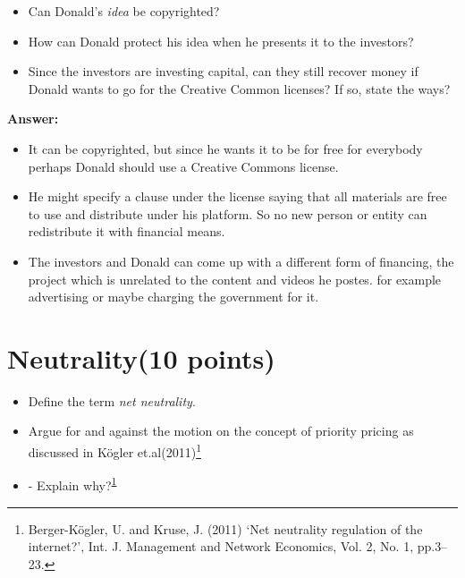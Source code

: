 \documentclass{WeSTassignment}
\begin{document}
\begin{itemize}
\item Can Donald's \emph{idea} be copyrighted?
\item How can Donald protect his idea when he presents it to the investors?
\item Since the investors are investing capital, can they still recover money if Donald wants to go for the Creative Common licenses? If so, state the ways?  \\
\end{itemize}

\textbf{Answer:}
\begin{itemize}
\item It can be copyrighted, but since he wants it to be for free for everybody perhaps Donald should use a Creative Commons license.
\item He might specify a clause under the license saying that all materials are free to use and distribute under his platform. So no new person or entity can redistribute it with financial means.
\item The investors and Donald can come up with a different form of financing, the project which is unrelated to the content and videos he postes. for example advertising or maybe charging the government for it.
\end{itemize}


\section{Neutrality(10 points)}

\begin{itemize}
\item Define the term \emph{net neutrality}.
\item Argue for and against the motion on the concept of priority pricing as discussed in Kögler et.al(2011)\footnote{\label{note1}Berger-Kögler, U. and Kruse, J. (2011) ‘Net neutrality regulation of the internet?’, Int. J. Management and Network Economics, Vol. 2, No. 1, pp.3–23.}
\item - Explain why?\textsuperscript{\ref{note1}}\\

\end{itemize}
\end{document}
